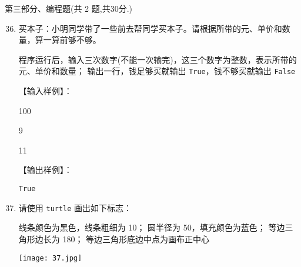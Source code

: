 \documentclass[11pt]{ctexart}
\begin{document}
    \newpage
    {\noindent\heiti 第三部分、编程题(共 2 题,共30分.)}
    \begin{enumerate}
        \setcounter{enumi}{35}
        
        \item 买本子：小明同学带了一些前去帮同学买本子。请根据所带的元、单价和数量，算一算前够不够。
        
        \begin{tasks}[label=(\arabic*)]
            \task 程序运行后，输入三次数字(不能一次输完)，这三个数字为整数，表示所带的元、单价和数量；
            \task 输出一行，钱足够买就输出 \lstinline{True}，钱不够买就输出 \lstinline{False}
        \end{tasks}

        【输入样例】：

        100

        9

        11

        【输出样例】：
       
        \lstinline{True}
        \vfill

        \item 请使用 \lstinline{turtle} 画出如下标志：
        
        \begin{minipage}{.55\textwidth}
            \begin{tasks}[label=(\arabic*)]
                \task 线条颜色为黑色，线条粗细为 10；
                \task 圆半径为 50，填充颜色为蓝色；
                \task 等边三角形边长为 180；
                \task 等边三角形底边中点为画布正中心
            \end{tasks}
        \end{minipage}
        \begin{minipage}{.35\textwidth}
            \centering
            \texttt{[image: 37.jpg]}
        \end{minipage}
        \vfill
    \end{enumerate}
\end{document}
